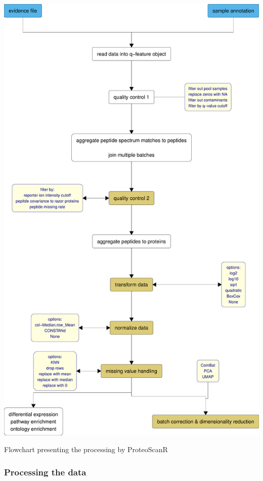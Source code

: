 \documentclass[
  11pt,
]{article}
\begin{document}
{\centering \includegraphics{Thesis_files/figure-latex/data_processing_pipeline_flowchart_vertical-1} 

}

\caption{Flowchart presenting the processing by ProteoScanR}\label{fig:data_processing_pipeline_flowchart_vertical}
 \endfigure\egroup

\hypertarget{processing-the-data}{%
\subsubsection{Processing the data}\label{processing-the-data}}
\end{document}
